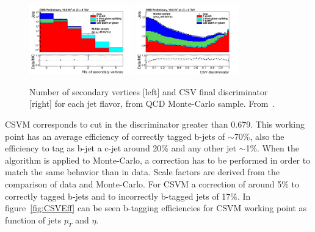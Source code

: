 \begin{figure}[!Hhtbp]
  \begin{center}
    \includegraphics[width=0.4\textwidth]{figs/sv_multi_0_Log.png}
    \includegraphics[width=0.4\textwidth]{figs/pdf-sub.png}
    \caption{Number of secondary vertices [left] and CSV final discriminator [right] for each jet flavor, from QCD Monte-Carlo sample. From~\cite{CMS-PAS-BTV-13-001}.}
    \label{fig:CSVVar}
  \end{center}
\end{figure}

CSVM corresponds to cut in the discriminator greater than 0.679. This working point has an average efficiency of correctly tagged b-jets of $\sim$70\%, also the efficiency to tag as b-jet a c-jet around 20\% and any other jet $\sim$1\%. When the algorithm is applied to Monte-Carlo, a correction has to be performed in order to match the same behavior than in data. Scale factors are derived from the comparison of data and Monte-Carlo. For CSVM a correction of around 5\% to correctly tagged b-jets and to incorrectly b-tagged jets of 17\%. In figure~\ref{fig:CSVEff} can be seen b-tagging efficiencies for CSVM working point as function of jets $p_{T}$ and $\eta$.  

